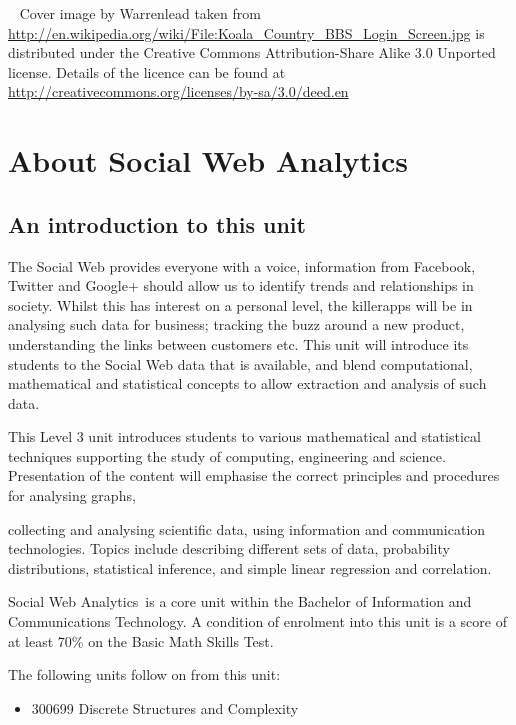 \documentclass[a4paper,oneside]{book}
\newcommand{\unitname}{Social Web Analytics}
\begin{document}
~
\vfill
\noindent
Cover image by Warrenlead taken from
\url{http://en.wikipedia.org/wiki/File:Koala_Country_BBS_Login_Screen.jpg}
is distributed under the Creative Commons Attribution-Share Alike 3.0 Unported 
license. Details of the licence can be found at
\url{http://creativecommons.org/licenses/by-sa/3.0/deed.en}

\newpage

\tableofcontents

\chapter{About \unitname}

\section{An introduction to this unit}


The Social Web provides everyone with a voice, information from
Facebook, Twitter and Google+ should allow us to identify trends and
relationships in society. Whilst this has interest on a personal
level, the killer­apps will be in analysing such data for business;
tracking the buzz around a new product, understanding the links
between customers etc. This unit will introduce its students to the
Social Web data that is available, and blend computational,
mathematical and statistical concepts to allow extraction and analysis
of such data.

This Level 3 unit introduces students to various mathematical and
statistical techniques supporting the study of computing, engineering
and science. Presentation of the content will emphasise the correct
principles and procedures for analysing graphs, 


collecting and analysing scientific
data, using information and communication technologies. Topics include
describing different sets of data, probability distributions,
statistical inference, and simple linear regression and correlation.


\unitname~is a core unit within the Bachelor of Information and
Communications Technology. A condition of enrolment into this unit is
a score of at least 70\% on the Basic Math Skills Test.

The following units follow on from this unit: 
\begin{itemize}
\item 300699 Discrete Structures and Complexity
\end{itemize}
\end{document}
